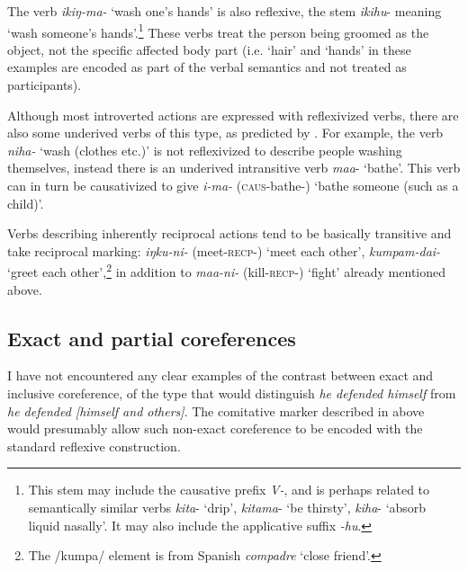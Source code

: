 \documentclass[output=paper]{langscibook}
\begin{document}
The verb \textit{ikiŋ-ma-} ‘wash one’s hands’ is also reflexive, the stem \textit{ikihu}{}- meaning ‘wash someone’s hands’.\footnote{This stem may include the causative prefix \textit{V-}, and is perhaps related to semantically similar verbs \textit{kita}{}- ‘drip’, \textit{kitama}{}- ‘be thirsty’, \textit{kiha}{}- ‘absorb liquid nasally’. It may also include the applicative suffix \textit{{}-hu}.} These verbs treat the person being groomed as the object, not the specific affected body part (i.e. ‘hair’ and ‘hands’ in these examples are encoded as part of the verbal semantics and not treated as participants).

Although most introverted actions are expressed with reflexivized verbs, there are also some underived verbs of this type, as predicted by \citet[803ff]{Haiman1983}. For example, the verb \textit{niha-} ‘wash (clothes etc.)’ is not reflexivized to describe people washing themselves, instead there is an underived intransitive verb \textit{maa}{}- ‘bathe’. This verb can in turn be causativized to give \textit{i-ma-} (\textsc{caus-}bathe-) ‘bathe someone (such as a child)’.

Verbs describing inherently reciprocal actions tend to be basically transitive and take reciprocal marking: \textit{iŋku-ni-} (meet-\textsc{recp}{}-) ‘meet each other’, \textit{kumpam-dai-} ‘greet each other’,\footnote{The /kumpa/ element is from Spanish \textit{compadre} ‘close friend’.} in addition to \textit{maa-ni-} (kill-\textsc{recp-}) ‘fight’ already mentioned above. 

\subsection{Exact and partial coreferences} %
\label{sec:overall:4.2}

I have not encountered any clear examples of the contrast between exact and inclusive coreference, of the type that would distinguish \textit{he defended himself} from \textit{he defended [himself and others]}. The comitative marker described in
 above would presumably allow such non-exact coreference to be encoded with the standard reflexive construction.
\end{document}
